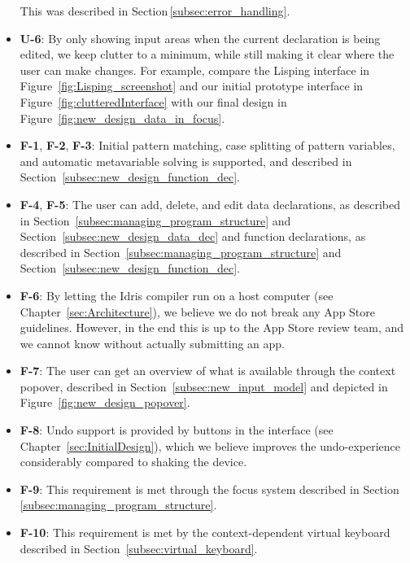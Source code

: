 \begin{itemize}
This was described in Section\,\ref{subsec:error_handling}.
\item \textbf{U-6}: By only showing input areas when the current declaration is being edited, we keep clutter to a minimum, while still making it clear where the user can make changes. For example, compare the Lisping interface in Figure~\ref{fig:Lisping_screenshot} and our initial prototype interface in  Figure~\ref{fig:clutteredInterface} with our final design in Figure~\ref{fig:new_design_data_in_focus}.
\item \textbf{F-1}, \textbf{F-2}, \textbf{F-3}: Initial pattern matching, case splitting of pattern variables, and automatic metavariable solving is supported, and described in Section~\ref{subsec:new_design_function_dec}.
\item \textbf{F-4}, \textbf{F-5}: The user can add, delete, and edit data declarations, as described in Section~\ref{subsec:managing_program_structure} and Section~\ref{subsec:new_design_data_dec}
and function declarations, as described in Section~\ref{subsec:managing_program_structure} and Section~\ref{subsec:new_design_function_dec}.
\item \textbf{F-6}: By letting the Idris compiler run on a host computer (see Chapter~\ref{sec:Architecture}), we believe we do not break any App Store guidelines. However, in the end this is up to the App Store review team, and we cannot know without actually submitting an app.
\item \textbf{F-7}: The user can get an overview of what is available through the context popover, described in Section~\ref{subsec:new_input_model}
and depicted in Figure~\ref{fig:new_design_popover}.
\item \textbf{F-8}: Undo support is provided by buttons in the interface (see Chapter~\ref{sec:InitialDesign}), which we believe improves the undo-experience considerably
compared to shaking the device.
\item \textbf{F-9}: This requirement is met through the focus system described in Section
\ref{subsec:managing_program_structure}.
\item \textbf{F-10}: This requirement is met by the context-dependent virtual keyboard described in Section~\ref{subsec:virtual_keyboard}.

\end{itemize}

